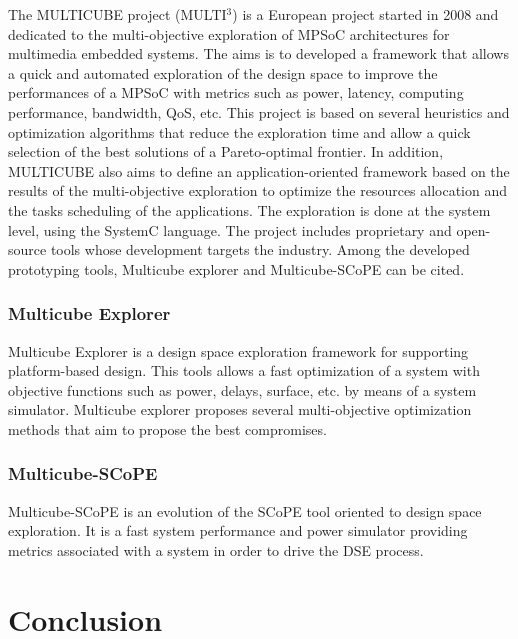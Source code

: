The MULTICUBE project (MULTI$^{3}$) \cite{multicube08, Silvanoetal09} is a European project started in 2008 and dedicated to the multi-objective exploration of MPSoC architectures for multimedia embedded systems. The aims is to developed a framework that allows a quick and automated exploration of the design space to improve the performances of a MPSoC with metrics such as power, latency, computing performance, bandwidth, QoS, etc. This project is based on several heuristics and optimization algorithms that reduce the exploration time and allow a quick selection of the best solutions of a Pareto-optimal frontier. In addition, MULTICUBE also aims to define an application-oriented framework based on the results of the multi-objective exploration to optimize the resources allocation and the tasks scheduling of the applications. The exploration is done at the system level, using the SystemC language. The project includes proprietary and open-source tools whose development targets the industry. Among the developed prototyping tools, Multicube explorer and Multicube-SCoPE can be cited.

\subsubsection{Multicube Explorer}

Multicube Explorer \cite{m3explorer09} is a design space exploration framework for supporting platform-based design. This tools allows a fast optimization of a system with objective functions such as power, delays, surface, etc. by means of a system simulator. Multicube explorer proposes several multi-objective optimization methods that aim to propose the best compromises.

\subsubsection{Multicube-SCoPE}

Multicube-SCoPE \cite{m3scope09} is an evolution of the SCoPE tool \cite{scope04} oriented to design space exploration. It is a fast system performance and power simulator providing metrics associated with a system in order to drive the DSE process.

\section{Conclusion}
